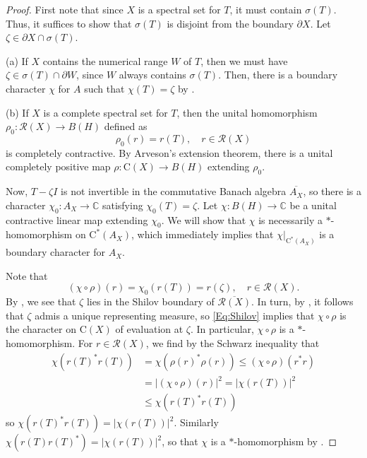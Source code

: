 \documentclass[10pt]{amsart}
\newcommand{\bC}{{\mathbb{C}}}
\newcommand{\R}{{\mathcal{R}}}
\newcommand{\rC}{\mathrm{C}}
\newcommand{\ol}{\overline}
\theoremstyle{definition}
\begin{document}
\begin{proof}
First note that since $X$ is a spectral set for $T$, it must contain $\sigma(T)$. Thus, it suffices to show that $\sigma(T)$ is disjoint from the boundary $\partial X$.  Let $\zeta\in \partial X\cap \sigma(T)$. 


(a)  If $X$ contains the numerical range $W$ of $T$, then we must have $\zeta\in \sigma(T)\cap  \partial W$, since $W$ always contains $\sigma(T)$. Then, there is a boundary character $\chi$ for $A$ such that $\chi(T)=\zeta$ by \cite[Theorem 3.1.2]{arveson1969}.


(b) If $X$ is a complete spectral set for $T$, then the unital homomorphism $\rho_0:\R(X)\to B(H)$ defined as
\[
\rho_0(r)= r(T), \quad r\in \R(X)
\]
is completely contractive. By Arveson's extension theorem, there is a unital completely positive map $\rho:\rC(X)\to B(H)$ extending $\rho_0$.

Now, $T-\zeta I$ is not invertible in the commutative Banach algebra $\ol{A_X}$, so there is a character $\chi_0:A_X\to\bC$ satisfying $\chi_0(T)=\zeta$.  Let $\chi:B(H)\to\bC$ be a unital contractive linear map extending $\chi_0$. We will show that $\chi$ is necessarily a $*$-homomorphism on $\rC^*(A_X)$, which immediately implies that $\chi|_{\rC^*(A_X)}$ is a boundary character for $A_X$.


Note that 
\begin{equation}\label{Eq:Shilov}
(\chi\circ \rho)(r)=\chi_0(r(T))=r(\zeta), \quad r\in \R(X).
\end{equation}
By  \cite[Theorem II.1.3]{gamelin1969}, we see that $\zeta$ lies in the Shilov boundary of $\ol{\R(X)}$. In turn, by \cite[Theorem II.11.3]{gamelin1969}, it follows that $\zeta$ admis a unique representing measure, so \eqref{Eq:Shilov} implies that $\chi\circ \rho$ is the character on $\rC(X)$ of evaluation at $\zeta$. In particular, $\chi\circ \rho$ is a $*$-homomorphism. For $r\in \R(X)$,  we find by the Schwarz inequality  \cite[Proposition 3.3]{paulsen2002} that 
\begin{align*}
\chi(r(T)^*r(T))&=\chi(\rho(r)^*\rho(r))\leq(\chi\circ \rho)(r^*r)\\
&=|(\chi\circ\rho)(r)|^2=|\chi(r(T))|^2\\
&\leq \chi(r(T)^*r(T))
\end{align*}
so $\chi(r(T)^*r(T))=|\chi(r(T))|^2$. Similarly $\chi(r(T)r(T)^*)=|\chi(r(T))|^2$, so that $\chi$ is a $*$-homomorphism by \cite[Theorem 3.18]{paulsen2002}.
\end{proof}
\end{document}
